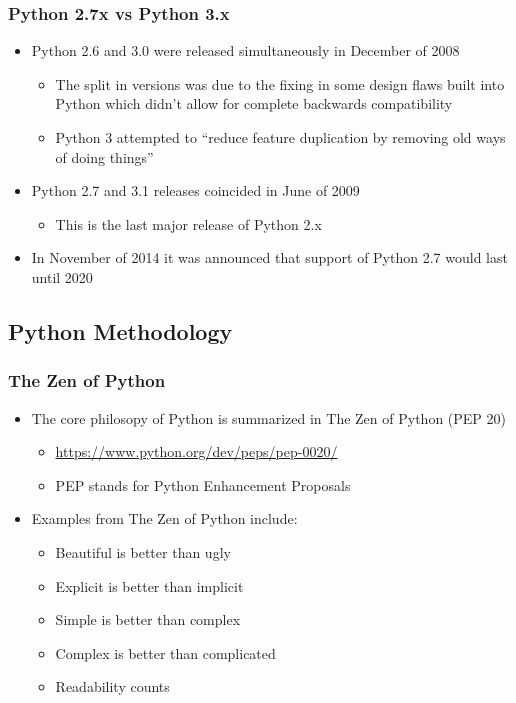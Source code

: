 \documentclass[mini frame in current subsection]{beamer}
\begin{document}
		\begin{frame}
			\frametitle{Python 2.7x vs Python 3.x}
			\begin{itemize}
				\vfill \item  Python 2.6 and 3.0 were released simultaneously in December of 2008
					\begin{itemize}
						\item  The split in versions was due to the fixing in some design flaws built into Python which didn't allow for complete backwards compatibility
						\item  Python 3 attempted to ``reduce feature duplication by removing old ways of doing things''
					\end{itemize}
				\vfill \item  Python 2.7 and 3.1 releases coincided in June of 2009
					\begin{itemize}
						\item  This is the last major release of Python 2.x
					\end{itemize}
				\vfill \item  In November of 2014 it was announced that support of Python 2.7 would last until 2020
			\end{itemize}
		\end{frame}
	
	\subsection{Python Methodology}
	
		\begin{frame}
			\frametitle{The Zen of Python}
			\begin{itemize}
				\vfill \item  The core philosopy of Python is summarized in The Zen of Python (PEP 20)
					\begin{itemize}
						\item  \url{https://www.python.org/dev/peps/pep-0020/}
						\item  PEP stands for Python Enhancement Proposals
					\end{itemize}
				\vfill \item Examples from The Zen of Python include:
					\begin{itemize}
						\item  Beautiful is better than ugly
						\item  Explicit is better than implicit
						\item  Simple is better than complex
						\item  Complex is better than complicated
						\item  Readability counts
					\end{itemize}
			\end{itemize}
		\end{frame}
	
\end{document}
